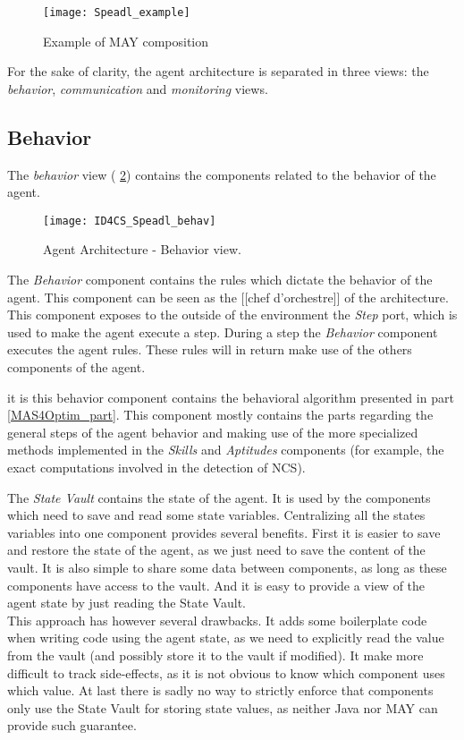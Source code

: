 \begin{figure}
\centering
\texttt{[image: Speadl\_example]}
\caption{Example of MAY composition}\label{Speadl_example}
\end{figure}

For the sake of clarity, the agent architecture is separated in three views: the \emph{behavior}, \emph{communication} and \emph{monitoring} views.

\subsection{Behavior}

The \emph{behavior} view (\figurename{} \ref{Arch-behavior}) contains the components related to the behavior of the agent. 

\begin{figure}
\centering
\texttt{[image: ID4CS\_Speadl\_behav]}
\caption{Agent Architecture - Behavior view.}
\label{Arch-behavior}
\end{figure}

The \emph{Behavior} component contains the rules which dictate the behavior of the agent. This component can be seen as the [[chef d'orchestre]] of the architecture. This component exposes to the outside of the environment the \emph{Step} port, which is used to make the agent execute a step. During a step the \emph{Behavior} component executes the agent rules. These rules will in return make use of the others components of the agent.

it is this behavior component contains the behavioral algorithm presented in part \ref{MAS4Optim_part}. This component mostly contains the parts regarding the general steps of the agent behavior and making use of the more specialized methods  implemented in the \emph{Skills} and \emph{Aptitudes} components (for example, the exact computations involved in the detection of NCS).

The \emph{State Vault} contains the state of the agent. It is used by the components which need to save and read some state variables. Centralizing all the states variables into one component provides several benefits. First it is easier to save and restore the state of the agent, as we just need to save the content of the vault. It is also simple to share some data between components, as long as these components have access to the vault. And it is easy to provide a view of the agent state by just reading the State Vault.\\
This approach has however several drawbacks. It adds some boilerplate code when writing code using the agent state, as we need to explicitly read the value from the vault (and possibly store it to the vault if modified). It make more difficult to track side-effects, as it is not obvious to know which component uses which value. At last there is sadly no way to strictly enforce that components only use the State Vault for storing state values, as neither Java nor MAY can provide such guarantee.

